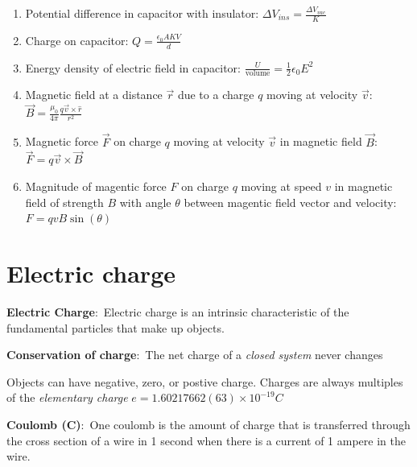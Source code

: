 \documentclass[nobib]{tufte-handout}
\newcommand{\defn}[2]{\noindent\textbf{#1}:\ #2}
\begin{document}
\begin{enumerate}
    \item Potential difference in capacitor with insulator: $\Delta V_{ins} = \frac{\Delta V_{vac}}{K}$
    \item Charge on capacitor: $Q=\frac{\epsilon_0 AKV}{d}$
    \item Energy density of electric field in capacitor: $\frac{U}{\text{volume}} = \frac{1}{2} \epsilon_0 E^2$
    \item Magnetic field at a distance $\vec{r}$ due to a charge $q$ moving at velocity $\vec{v}$: $\vec{B} = \frac{\mu_0}{4 \pi}\frac{q\vec{v}\times \hat{r}}{r^2}$
    \item Magnetic force $\vec{F}$ on charge $q$ moving at velocity $\vec{v}$ in magnetic field $\vec{B}$: 
    $\vec{F} = q\vec{v} \times \vec{B}$
    \item Magnitude of magentic force $F$ on charge $q$ moving at speed $v$ in magnetic field of strength $B$
    with angle $\theta$ between magentic field vector and velocity: $F = qvB\sin(\theta)$
\end{enumerate}

\pagebreak

\section{Electric charge}

\defn{Electric Charge}{Electric charge is an intrinsic characteristic of the
fundamental particles that make up objects.}


\defn{Conservation of charge}{The net charge of a \emph{closed system} never changes}

Objects can have negative, zero, or postive charge. 
Charges are always multiples of the \emph{elementary charge} $e = 1.60217662(63) \times 10^{-19} C$

\defn{Coulomb (C)}{One coulomb is the amount of charge that is
transferred through the cross section of a wire in 1 second
when there is a current of 1 ampere in the wire.}
\end{document}
